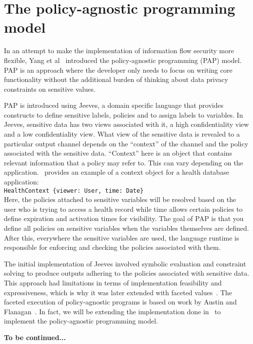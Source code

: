 \section{The policy-agnostic programming model}
In an attempt to make the implementation of information flow security more flexible,
Yang et al~\cite{Jeeves} introduced the policy-agnostic programming (PAP) model.
PAP is an approach where the developer only needs to focus on writing core functionality
without the additional burden of thinking about data privacy constraints on sensitive
values.

PAP is introduced using Jeeves, a domain specific language that provides constructs
to define sensitive labels, policies and to assign labels to variables. In Jeeves,
sensitive data has two views associated with it, a high confidentiality view and a
low confidentiality view. What view of the sensitive data is revealed to a particular
output channel depends on the ``context'' of the channel and the policy associated with the
sensitive data. ``Context'' here is an object that contains relevant information
that a policy may refer to. This can vary depending on the application.~\cite{FacetedJeeves}
provides an example of a context object for a health database application:\\
\indent\texttt{HealthContext \{viewer: User, time: Date\}}\\
Here, the policies attached to sensitive variables will be resolved based on the
user who is trying to access a health record while time allows certain policies
to define expiration and activation times for visibility.
The goal of PAP is that you define all policies on sensitive variables
when the variables themselves are defined. After this, everywhere the sensitive variables
are used, the language runtime is responsible for enforcing and checking the policies
associated with them.

The initial implementation of Jeeves involved symbolic evaluation and constraint
solving to produce outputs adhering to the policies associated with sensitive data.
This approach had limitations in terms of implementation feasibility and expressiveness,
which is why it was later extended with faceted values~\cite{FacetedJeeves}.
The faceted execution of policy-agnostic programs is based on work by Austin and
Flanagan~\cite{Faceted}. In fact, we will be extending the implementation done
in~\cite{Faceted} to implement the policy-agnostic programming model.

\textbf{To be continued...}
